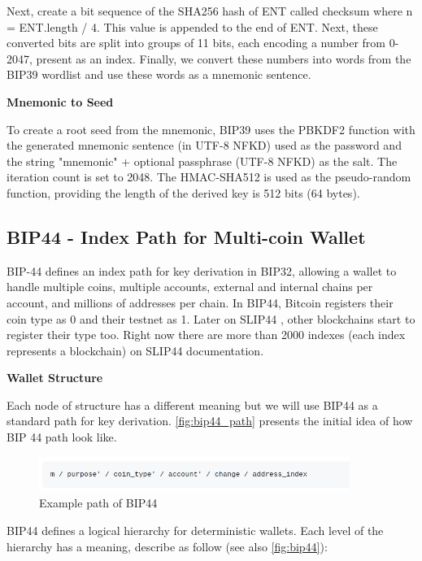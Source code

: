 Next, create a bit sequence of the SHA256 hash of ENT called checksum where n = ENT.length / 4. This value is appended to the end of ENT. Next, these converted bits are split into groups of 11 bits, each encoding a number from 0-2047, present as an index. Finally, we convert these numbers into words from the BIP39 wordlist and use these words as a mnemonic sentence.

\bigskip
{\textbf{Mnemonic to Seed}}

To create a root seed from the mnemonic, BIP39 uses the PBKDF2 function with the generated mnemonic sentence (in UTF-8 NFKD) used as the password and the string "mnemonic" + optional passphrase (UTF-8 NFKD) as the salt. The iteration count is set to 2048. The HMAC-SHA512 is used as the pseudo-random function, providing the length of the derived key is 512 bits (64 bytes).


\subsection{BIP44 - Index Path for Multi-coin Wallet}
BIP-44 defines an index path for key derivation in BIP32, allowing a wallet to handle multiple coins, multiple accounts, external and internal chains per account, and millions of addresses per chain. In BIP44, Bitcoin registers their coin type as 0 and their testnet as 1. Later on SLIP44 \cite{bip44}, other blockchains start to register their type too. Right now there are more than 2000 indexes (each index represents a blockchain) on SLIP44 documentation.

\bigskip
{\textbf{Wallet Structure}}

Each node of structure has a different meaning but we will use BIP44 as a standard path for key derivation. \autoref{fig:bip44_path} presents the initial idea of how BIP 44 path look like.

\begin{figure}[ht!]
    \centering
    \includegraphics[width=0.9\textwidth]{images/bip44_path.png}
    \caption[Example path of BIP44]{Example path of BIP44}
    \label{fig:bip44_path}
\end{figure}

BIP44 defines a logical hierarchy for deterministic wallets. Each level of the hierarchy has a meaning, describe as follow (see also \autoref{fig:bip44}):

